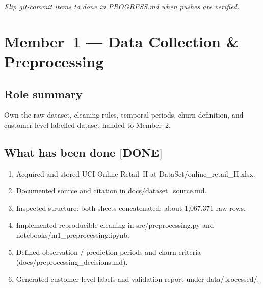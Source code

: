 \documentclass[11pt,a4paper]{article}
\newcommand{\done}{[DONE]}
\renewcommand{\texttt}[1]{#1}
\begin{document}
\vspace{0.6em}
\noindent\textit{Flip git-commit items to done in \texttt{PROGRESS.md} when pushes are verified.}

\newpage
\section{Member~1 --- Data Collection \& Preprocessing}
\label{sec:m1}

\subsection{Role summary}
Own the raw dataset, cleaning rules, temporal periods, churn definition, and
customer-level labelled dataset handed to Member~2.

\subsection{What has been done \done{}}
\begin{enumerate}
  \item Acquired and stored UCI Online Retail~II at
        \texttt{DataSet/online\_retail\_II.xlsx}.
  \item Documented source and citation in \texttt{docs/dataset\_source.md}.
  \item Inspected structure: both sheets concatenated; about 1{,}067{,}371 raw rows.
  \item Implemented reproducible cleaning in \texttt{src/preprocessing.py}
        and \texttt{notebooks/m1\_preprocessing.ipynb}.
  \item Defined observation / prediction periods and churn criteria
        (\texttt{docs/preprocessing\_decisions.md}).
  \item Generated customer-level labels and validation report under
        \texttt{data/processed/}.
\end{enumerate}
\end{document}
